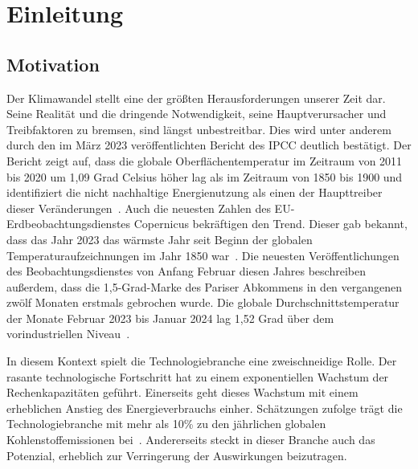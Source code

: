 \chapter{Einleitung}

\section{Motivation}
Der Klimawandel stellt eine der größten Herausforderungen unserer Zeit dar.
Seine Realität und die dringende Notwendigkeit, seine Hauptverursacher und Treibfaktoren zu bremsen, sind längst unbestreitbar.
Dies wird unter anderem durch den im März 2023 veröffentlichten Bericht des \ac{IPCC} deutlich bestätigt.
Der Bericht zeigt auf, dass die globale Oberflächentemperatur im Zeitraum von 2011 bis 2020 um 1,09 Grad Celsius höher lag als im Zeitraum von 1850 bis 1900 und identifiziert die nicht nachhaltige Energienutzung als einen der Haupttreiber dieser Veränderungen~\cite{IPCC.2023}.
Auch die neuesten Zahlen des EU-Erdbeobachtungsdienstes Copernicus bekräftigen den Trend.
Dieser gab bekannt, dass das Jahr 2023 das wärmste Jahr seit Beginn der globalen Temperaturaufzeichnungen im Jahr 1850 war~\cite{CopernicusClimateChangeService.09.01.2024}.
Die neuesten Veröffentlichungen des Beobachtungsdienstes von Anfang Februar diesen Jahres beschreiben außerdem, dass die 1,5-Grad-Marke des Pariser Abkommens in den vergangenen zwölf Monaten erstmals gebrochen wurde.
Die globale Durchschnittstemperatur der Monate Februar 2023 bis Januar 2024 lag 1,52 Grad über dem vorindustriellen Niveau~\cite{Eichhorn.8.2.2024}.

In diesem Kontext spielt die Technologiebranche eine zweischneidige Rolle.
Der rasante technologische Fortschritt hat zu einem exponentiellen Wachstum der Rechenkapazitäten geführt.
Einerseits geht dieses Wachstum mit einem erheblichen Anstieg des Energieverbrauchs einher.
Schätzungen zufolge trägt die Technologiebranche mit mehr als 10\% zu den jährlichen globalen Kohlenstoffemissionen bei~\cite{Buchanan.2023}.
Andererseits steckt in dieser Branche auch das Potenzial, erheblich zur Verringerung der Auswirkungen beizutragen.

